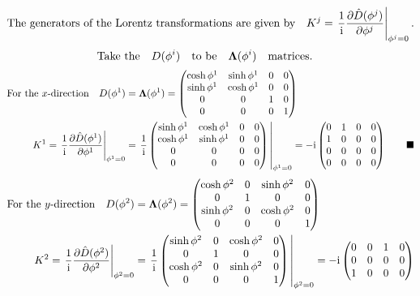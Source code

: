 \documentclass{article}
\begin{document}
\[\qq*{The generators of the Lorentz transformations are given by}K^j=\eval{\frac{1}{\text{i}}\pdv{\hat{D}(\phi^j)}{\phi^j}}_{\phi^j=0}.\]
\[ \qq*{Take the} D(\phi^i) \qq{to be}\vb{\Lambda}(\phi^i)\qq{matrices.}\]
\begin{align*}
\qq*{For the $x$-direction}D(\phi^1)&=\vb{\Lambda}(\phi^1)=\begin{pmatrix}
\cosh{\phi^1}&\sinh{\phi^1}&0&0\\
\sinh{\phi^1}&\cosh{\phi^1} & 0&0 \\ 
0 & 0&1&0\\
0&0&0&1
\end{pmatrix}\\
K^1=\eval{\frac{1}{\text{i}}\pdv{\hat{D}(\phi^1)}{\phi^1}}_{\phi^1=0}&=\eval{\frac{1}{\text{i}}\begin{pmatrix}
		\sinh{\phi^1}&\cosh{\phi^1}&0&0\\
		\cosh{\phi^1}&\sinh{\phi^1} & 0&0 \\ 
		0 & 0&0&0\\
		0&0&0&0
		\end{pmatrix}}_{\phi^1=0}=-\text{i}\begin{pmatrix}
		0&1&0&0\\
		1&0 & 0&0 \\ 
		0 & 0&0&0\\
		0&0&0&0
		\end{pmatrix}\qquad\blacksquare
\end{align*}\begin{align*}
\qq*{For the $y$-direction}D(\phi^2)&=\vb{\Lambda}(\phi^2)=\begin{pmatrix}
\cosh{\phi^2}&0&\sinh{\phi^2}&0\\
0&1 & 0&0 \\ 
\sinh{\phi^2} & 0&\cosh{\phi^2}&0\\
0&0&0&1
\end{pmatrix}\\
K^2=\eval{\frac{1}{\text{i}}\pdv{\hat{D}(\phi^2)}{\phi^2}}_{\phi^2=0}&=\eval{\frac{1}{\text{i}}\begin{pmatrix}
\sinh{\phi^2}&0&\cosh{\phi^2}&0\\
0&1 & 0&0 \\ 
\cosh{\phi^2} & 0&\sinh{\phi^2}&0\\
0&0&0&1
		\end{pmatrix}}_{\phi^2=0}=-\text{i}\begin{pmatrix}
		0&0&1&0\\
		0 & 0&0&0\\
		1&0 & 0&0 \\ 

\end{pmatrix}
\end{align*}
\end{document}
